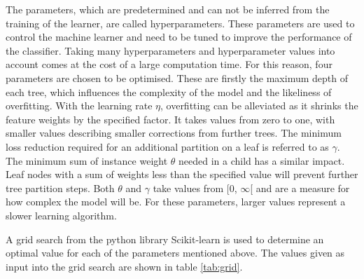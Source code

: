 The parameters, which are predetermined and can not be inferred from the training of the learner, are called hyperparameters. These parameters are used
to control the machine learner and need to be tuned to improve the performance of the classifier.
Taking many hyperparameters and hyperparameter values into account comes at the
cost of a large computation time. For this reason, four parameters are chosen to be optimised. These are firstly the maximum depth of each tree, which influences the
complexity of the model and the likeliness of overfitting. With the learning rate $\eta$, overfitting can be alleviated as it shrinks the feature weights
by the specified factor. It takes values from zero to one, with smaller values describing smaller corrections from further trees.
The minimum loss reduction required for an additional partition on a leaf is referred to as $\gamma$. The minimum sum of instance weight $\theta$
needed in a child has a similar impact. Leaf nodes with a sum of weights less than the specified value will prevent further tree partition steps.
Both $\theta$ and $\gamma$ take values from [0, $\infty$[ and are a measure for how complex the model will be.
For these parameters, larger values represent a slower learning algorithm.

A grid search from the python \cite{python} library Scikit-learn \cite{scikit} is used to determine an optimal
value for each of the parameters mentioned above. The values given as input into the grid search
are shown in table \ref{tab:grid}.

